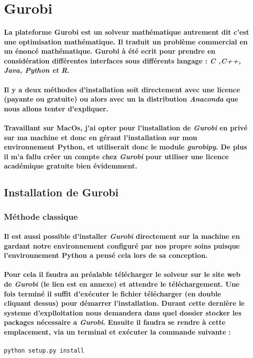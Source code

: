 \documentclass[a4paper, 12pt, twoside]{article}
\begin{document}
\section{Gurobi}
\paragraph{La plateforme Gurobi est un solveur mathématique autrement dit c'est une optimisation mathématique. Il traduit un problème commercial en un énoncé mathématique. Gurobi à été ecrit pour prendre en considération différentes interfaces sous différents langage : \textit{C ,C++, Java, Python et R}.}

\paragraph{Il y a deux méthodes d'installation soit directement avec une licence (payante ou gratuite) ou alors avec un la distribution \textit{Anaconda} que nous allons tenter d'expliquer.}
\paragraph{Travaillant sur MacOs, j'ai opter pour l'installation de \textit{Gurobi} en privé sur ma machine et donc en gérant l'installation sur mon environnement Python, et utiliserait donc le module \emph{gurobipy}. De plus il m'a fallu créer un compte chez \textit{Gurobi} pour utiliser une licence académique gratuite bien évidemment.}

\subsection{Installation de Gurobi}
\subsubsection{Méthode classique }
\paragraph{Il est aussi possible d'installer \textit{Gurobi} directement sur la machine en gardant notre environnement configuré par nos propre soins puisque l'environnement Python a pensé cela lors de sa conception. }
\paragraph{Pour cela il faudra au préalable télécharger le solveur sur le site web de \textit{Gurobi} (le lien est en annexe) et attendre le téléchargement. Une fois terminé il suffit d'exécuter le fichier télécharger (en double cliquant dessus) pour démarrer l'installation. Durant cette dernière le systeme d'explloitation nous demandera dans quel dossier stocker les packages nécessaire a \textit{Gurobi}. Ensuite il faudra se rendre à cette emplacement, via un terminal et exécuter la commande suivante : }
\begin{verbatim}
python setup.py install
\end{verbatim}
\end{document}
